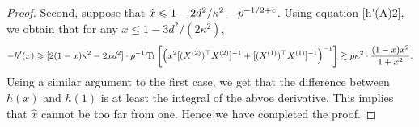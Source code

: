 \begin{proof}
Second, suppose that $\hat{x} \leqslant 1 - 2d^2/ \kappa^2 - p^{-1/2 + {\mathit{c}}}$.
Using equation \eqref{h'(A)2}, we obtain that for any $x \le 1 - 3d^2/(2\kappa^2)$,
	\[ -h'(x)\geqslant  [2(1-x)\kappa^2 - 2xd^2] \cdot p^{-1} \operatorname{Tr}\left[\left(x^2[(X^{(2)})^\top X^{(2)}]^{-1} + [(X^{(1)})^\top X^{(1)}]^{-1}\right)^{-1}\right]  \gtrsim p\kappa^2 \cdot \frac{(1 - x)x^2}{1 + x^2}. \]
Using a similar argument to the first case, we get that the difference between $h(x)$ and $h(1)$ is at least the integral of the abvoe derivative.
This implies that $\hat{x}$ cannot be too far from one.
Hence we have completed the proof.
%
\end{proof}

